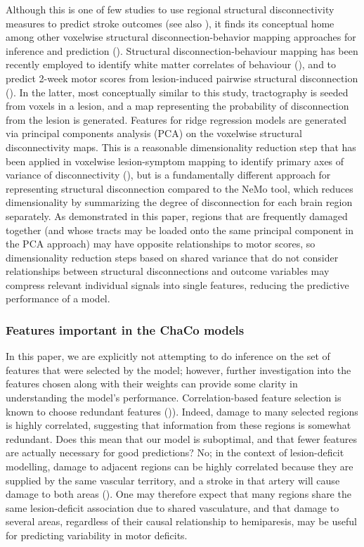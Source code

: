 \documentclass[10pt]{article}
\begin{document}
Although this is one of few studies to use regional structural disconnectivity measures to predict stroke outcomes (see also \cite{Tozlu2020-qa, Kuceyeski2016-vj}), it finds its conceptual home among other voxelwise structural disconnection-behavior mapping approaches for inference and prediction (\cite{Salvalaggio2020-pe, Wawrzyniak2022-kl, Foulon2018-bj, Sperber2022-oj}). Structural disconnection-behaviour mapping has been recently employed to identify white matter correlates of behaviour (\cite{Wawrzyniak2022-kl, Foulon2018-bj}), and to predict 2-week motor scores from lesion-induced pairwise structural disconnection (\cite{Salvalaggio2020-pe}). In the latter, most conceptually similar to this study, tractography is seeded from voxels in a lesion, and a map representing the probability of disconnection from the lesion is generated. Features for ridge regression models are generated via principal components analysis (PCA) on the voxelwise structural disconnectivity maps. This is a reasonable dimensionality reduction step that has been applied in voxelwise lesion-symptom mapping to identify primary axes of variance of disconnectivity (\cite{Ivanova2021-nh}), but is a fundamentally different approach for representing structural disconnection compared to the NeMo tool, which reduces dimensionality by summarizing the degree of disconnection for each brain region separately. As demonstrated in this paper, regions that are frequently damaged together (and whose tracts may be loaded onto the same principal component in the PCA approach) may have opposite relationships to motor scores, so dimensionality reduction steps based on shared variance that do not consider relationships between structural disconnections and outcome variables may compress relevant individual signals into single features, reducing the predictive performance of a model. 

\subsubsection*{Features important in the ChaCo models}

In this paper, we are explicitly not attempting to do inference on the set of features that were selected by the model; however, further investigation into the features chosen along with their weights can provide some clarity in understanding the model's performance. Correlation-based feature selection is known to choose redundant features (\cite{Guyon2003-kj})). Indeed, damage to many selected regions is highly correlated, suggesting that information from these regions is somewhat redundant. Does this mean that our model is suboptimal, and that fewer features are actually necessary for good predictions? No; in the context of lesion-deficit modelling, damage to adjacent regions can be highly correlated because they are supplied by the same vascular territory, and a stroke in that artery will cause damage to both areas (\cite{Mah2014-cb, Sperber2020-kp}). One may therefore expect that many regions share the same lesion-deficit association due to shared vasculature, and that damage to several areas, regardless of their causal relationship to hemiparesis, may be useful for predicting variability in motor deficits. 
\end{document}
